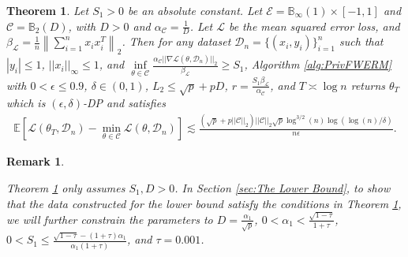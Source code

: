 \documentclass{article}
\newtheorem{theorem}{Theorem}
\newtheorem{remark}{\textbf{Remark}}
\begin{document}
\begin{theorem}
\label{theorem:UPRidge}
Let $S_1 > 0$ be an absolute constant. Let $\mathcal{E} = \mathbb{B}_{\infty}(1) \times [-1, 1]$ and $\mathcal{C} = \mathbb{B}_2\left(D\right)$, with $D > 0$ and $\alpha_{\mathcal{C}} = \frac{1}{D}$. Let $\mathcal{L}$ be the mean squared error loss, and $\beta_{\mathcal{L}} = \frac{1}{n}\left\|\sum_{i = 1}^nx_ix_i^T\right\|_2$. Then for any dataset $\mathcal{D}_n = \{(x_i, y_i)\}_{i = 1}^n$ such that $|y_i| \leq 1$, $||x_i||_{\infty} \leq 1$, and $\mathop{\inf}\limits_{\theta \in \mathcal{C}}\frac{\alpha_{\mathcal{C}}||\nabla \mathcal{L}(\theta, \mathcal{D}_n)||_2}{\beta_{\mathcal{L}}} \geq S_1$, Algorithm \ref{alg:PrivFWERM} with $0 < \epsilon \le 0.9$, $\delta \in (0, 1)$, $L_2 \leq \sqrt{p} + pD$, $r = \frac{S_1\beta_{\mathcal{L}}}{\alpha_{\mathcal{C}}}$,
and $T \asymp \log n$
returns $\theta_T$ which is $(\epsilon, \delta)$-DP and satisfies
\begin{align*}
\mathbb{E}\left[\mathcal{L}(\theta_T, \mathcal{D}_n) - \mathop{\min}\limits_{\theta \in \mathcal{C}}\mathcal{L}(\theta, \mathcal{D}_n)\right] \lesssim \frac{(\sqrt{p} + p||\mathcal{C}||_2)||\mathcal{C}||_2\sqrt{p}\log^{3/2}(n)\log(\log(n)/\delta)}{n\epsilon}.
\end{align*}
\end{theorem}

\begin{remark}
\label{remark:UP_Bridge_DP_Dist_Free}



Theorem \ref{theorem:UPRidge} only assumes $S_1, D > 0$. In Section \ref{sec:The Lower Bound}, to show that the data constructed for the lower bound satisfy the conditions in Theorem \ref{theorem:UPRidge}, we will further constrain the parameters to $D = \frac{\alpha_1}{\sqrt{p}}$, $0 < \alpha_1 < \frac{\sqrt{1 - \tau}}{1 + \tau}$, $0 < S_1 \leq \frac{\sqrt{1 - \tau} - (1 + \tau)\alpha_1}{\alpha_1(1 + \tau)}$, and $\tau = 0.001$.
\end{remark}
\end{document}
